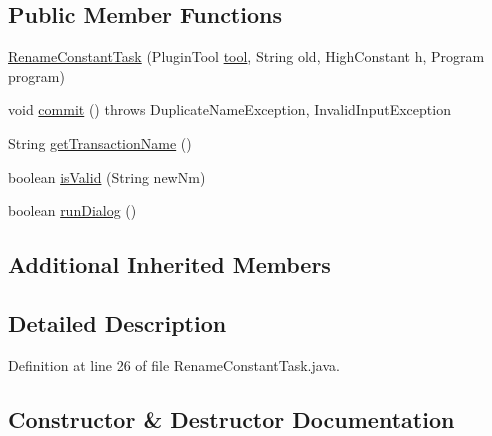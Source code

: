 \subsection*{Public Member Functions}
\begin{DoxyCompactItemize}
\item 
\mbox{\hyperlink{classghidra_1_1app_1_1plugin_1_1core_1_1decompile_1_1actions_1_1_rename_constant_task_a43932af567af4de1aad07d541e7feea0}{Rename\+Constant\+Task}} (Plugin\+Tool \mbox{\hyperlink{classghidra_1_1app_1_1plugin_1_1core_1_1decompile_1_1actions_1_1_rename_task_aded3c0474f9fa5697b5b550bc2709597}{tool}}, String old, High\+Constant h, Program program)
\item 
void \mbox{\hyperlink{classghidra_1_1app_1_1plugin_1_1core_1_1decompile_1_1actions_1_1_rename_constant_task_a6384e3306df3c9e12f1398eb682db5af}{commit}} ()  throws Duplicate\+Name\+Exception, Invalid\+Input\+Exception 
\item 
String \mbox{\hyperlink{classghidra_1_1app_1_1plugin_1_1core_1_1decompile_1_1actions_1_1_rename_constant_task_a5b400efc51f8293190b2397fda9edcb7}{get\+Transaction\+Name}} ()
\item 
boolean \mbox{\hyperlink{classghidra_1_1app_1_1plugin_1_1core_1_1decompile_1_1actions_1_1_rename_constant_task_aae1ff61b599481c72a313b2fa3bdcfc7}{is\+Valid}} (String new\+Nm)
\item 
boolean \mbox{\hyperlink{classghidra_1_1app_1_1plugin_1_1core_1_1decompile_1_1actions_1_1_rename_constant_task_a2ce5a9006ee92b6197de752e2e76afb1}{run\+Dialog}} ()
\end{DoxyCompactItemize}
\subsection*{Additional Inherited Members}


\subsection{Detailed Description}


Definition at line 26 of file Rename\+Constant\+Task.\+java.



\subsection{Constructor \& Destructor Documentation}
\mbox{\label{classghidra_1_1app_1_1plugin_1_1core_1_1decompile_1_1actions_1_1_rename_constant_task_a43932af567af4de1aad07d541e7feea0}} 
